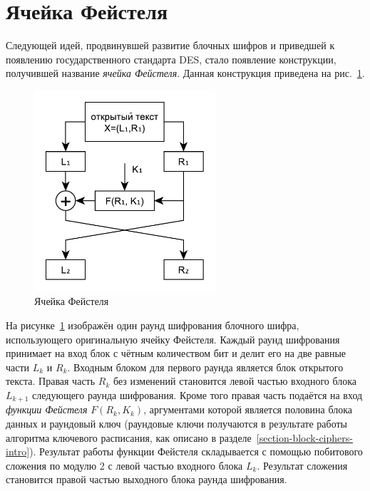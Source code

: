 \section{Ячейка Фейстеля}

Следующей идей, продвинувшей развитие блочных шифров и приведшей к появлению государственного стандарта DES, стало появление конструкции, получившей название \emph{ячейка Фейстеля}. Данная конструкция приведена на рис.~\ref{fig:Feistel}.

\begin{figure}[!htb]
    \centering
    \includegraphics[width=0.6\textwidth]{pic/feistel}
    \caption{Ячейка Фейстеля\label{fig:Feistel}}
\end{figure}

На рисунке~\ref{fig:Feistel} изображён один раунд шифрования блочного шифра, использующего оригинальную ячейку Фейстеля. Каждый раунд шифрования принимает на вход блок с чётным количеством бит и делит его на две равные части $L_k$ и $R_k$. Входным блоком для первого раунда является блок открытого текста. Правая часть $R_k$ без изменений становится левой частью входного блока $L_{k+1}$ следующего раунда шифрования. Кроме того правая часть подаётся на вход \emph{функции Фейстеля} $F\left(R_k, K_k \right)$, аргументами которой является половина блока данных и раундовый ключ (раундовые ключи получаются в результате работы алгоритма ключевого расписания, как описано в разделе~\ref{section-block-ciphers-intro}). Результат работы функции Фейстеля складывается с помощью побитового сложения по модулю 2 с левой частью входного блока $L_k$. Результат сложения становится правой частью выходного блока раунда шифрования.

